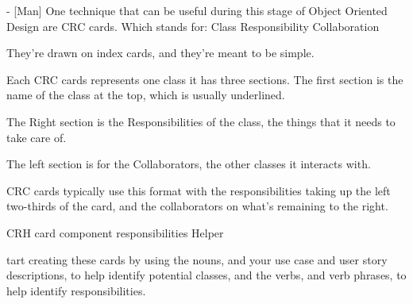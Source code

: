 - [Man] One technique that can be useful during this stage of Object Oriented Design are CRC cards. 
Which stands for: 
  Class 
  Responsibility
  Collaboration


They're drawn on index cards, and they're meant to be simple.

Each CRC cards represents one class 
  it has three sections. The first section is the name of the class at the top, which is usually underlined. 
  
  The Right section  is the Responsibilities of the class, the things that it needs to take care of. 

  The left section   is for the Collaborators, the other classes it interacts with. 
  
  
CRC cards typically use this format with the responsibilities taking up the left two-thirds of the card, and the collaborators on what's remaining to the right.

CRH card 
  component 
  responsibilities
  Helper 

tart creating these cards by using the nouns, and your use case and user story descriptions, to help identify potential classes, and the verbs, and verb phrases, to help identify responsibilities. 